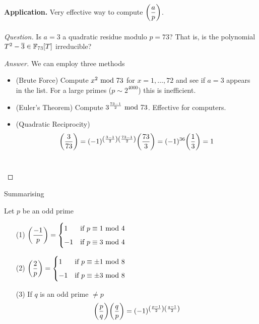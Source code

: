 \vspace*{1em}

{\bf Application.} Very effective way to compute $\bigg(\dfrac{a}{p}\bigg)$.\\
\\
\emph{Question.} Is $a = 3$ a quadratic residue modulo $p = 73$? That is, is the polynomial $T^2 - \overline{3} \in \mathbb F_{73}[T]$ irreducible?
\begin{proof}[Answer]
We can employ three methods
\begin{itemize}
\item (Brute Force) Compute $x^2 \text{ mod }{73}$ for $x = 1,\ldots,72$ and see if $a = 3$ appears in the list. For a large primes ($p \sim 2^{4000}$) this is inefficient.
\item (Euler's Theorem) Compute $3^{\frac{73-1}{2}}\text{ mod }{73}$. Effective for computers.
\item (Quadratic Reciprocity)
\[\bigg(\dfrac{3}{73}\bigg) = (-1)^{\left(\frac{3-1}{2}\right)\left(\frac{73-1}{2}\right)}\bigg(\dfrac{73}{3}\bigg) = (-1)^{36}\bigg(\dfrac{1}{3}\bigg) = 1\]\\[-4em]
\end{itemize}
\end{proof}

\vspace*{1em}

Summarising
\begin{theorem}
Let $p$ be an odd prime
\begin{itemize}[itemsep=1em]
\item[(1)] $\displaystyle \bigg(\dfrac{-1}{p}\bigg) = \begin{cases}1 & \text{if $p\equiv 1 \text{ mod }{4}$}\\[0.5em] -1 & \text{if $p\equiv 3 \text{ mod }{4}$} \end{cases}$
\item[(2)] $\displaystyle \bigg(\dfrac{2}{p}\bigg) = \begin{cases} 1 & \text{if $p\equiv \pm 1\text{ mod }{8}$}\\[0.5em] -1 & \text{if $p\equiv \pm 3\text{ mod }{8}$} \end{cases}$
\item[(3)] If $q$ is an odd prime $\neq p$
\[\bigg(\dfrac{p}{q}\bigg)\bigg(\dfrac{q}{p}\bigg) = (-1)^{\left(\frac{p-1}{2}\right)\left(\frac{q-1}{2}\right)}\]
\end{itemize}
\end{theorem}


